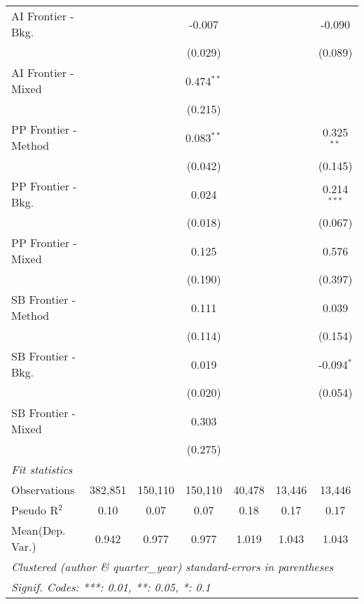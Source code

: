 \begin{tabular}{lcccccc}
   AI Frontier - Bkg.   &               &              & -0.007        &               &               & -0.090\\   
                        &               &              & (0.029)       &               &               & (0.089)\\   
   AI Frontier - Mixed  &               &              & 0.474$^{**}$  &               &               &   \\   
                        &               &              & (0.215)       &               &               &   \\   
   PP Frontier - Method &               &              & 0.083$^{**}$  &               &               & 0.325$^{**}$\\   
                        &               &              & (0.042)       &               &               & (0.145)\\   
   PP Frontier - Bkg.   &               &              & 0.024         &               &               & 0.214$^{***}$\\   
                        &               &              & (0.018)       &               &               & (0.067)\\   
   PP Frontier - Mixed  &               &              & 0.125         &               &               & 0.576\\   
                        &               &              & (0.190)       &               &               & (0.397)\\   
   SB Frontier - Method &               &              & 0.111         &               &               & 0.039\\   
                        &               &              & (0.114)       &               &               & (0.154)\\   
   SB Frontier - Bkg.   &               &              & 0.019         &               &               & -0.094$^{*}$\\   
                        &               &              & (0.020)       &               &               & (0.054)\\   
   SB Frontier - Mixed  &               &              & 0.303         &               &               &   \\   
                        &               &              & (0.275)       &               &               &   \\   
   \midrule
   \emph{Fit statistics}\\
   Observations         & 382,851       & 150,110      & 150,110       & 40,478        & 13,446        & 13,446\\  
   Pseudo R$^2$         & 0.10          & 0.07         & 0.07          & 0.18          & 0.17          & 0.17\\  
Mean(Dep. Var.) & 0.942 & 0.977 & 0.977 & 1.019 & 1.043 & 1.043 \\
   \midrule \midrule
   \multicolumn{7}{l}{\emph{Clustered (author \& quarter\_year) standard-errors in parentheses}}\\
   \multicolumn{7}{l}{\emph{Signif. Codes: ***: 0.01, **: 0.05, *: 0.1}}\\
\end{tabular}
\par\endgroup
